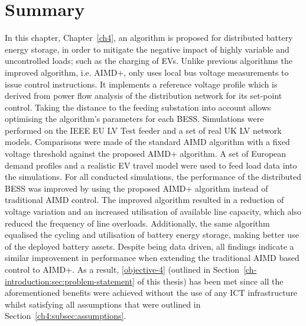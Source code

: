 \section{Summary}
\label{ch4:sec:summary}

In this chapter, Chapter~\ref{ch4}, an algorithm is proposed for distributed battery energy storage, in order to mitigate the negative impact of highly variable and uncontrolled loads; such as the charging of EVs.
Unlike previous algorithms the improved algorithm, i.e. AIMD+, only uses local bus voltage measurements to issue control instructions.
It implements a reference voltage profile which is derived from power flow analysis of the distribution network for its set-point control.
Taking the distance to the feeding substation into account allows optimising the algorithm's parameters for each BESS.
Simulations were performed on the IEEE EU LV Test feeder and a set of real UK LV network models.
Comparisons were made of the standard AIMD algorithm with a fixed voltage threshold against the proposed AIMD+ algorithm.
A set of European demand profiles and a realistic EV travel model were used to feed load data into the simulations.
For all conducted simulations, the performance of the distributed BESS was improved by using the proposed AIMD+ algorithm instead of traditional AIMD control.
The improved algorithm resulted in a reduction of voltage variation and an increased utilisation of available line capacity, which also reduced the frequency of line overloads.
Additionally, the same algorithm equalised the cycling and utilisation of battery energy storage, making better use of the deployed battery assets.
Despite being data driven, all findings indicate a similar improvement in performance when extending the traditional AIMD based control to AIMD+.
As a result, \ref{objective-4} (outlined in Section~\ref{ch-introduction:sec:problem-statement} of this thesis) has been met since all the aforementioned benefits were achieved without the use of any ICT infrastructure whilst satisfying all assumptions that were outlined in Section~\ref{ch4:subsec:assumptions}.